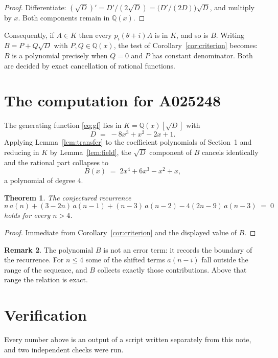 \documentclass[11pt,a4paper]{article}
\theoremstyle{plain}
\newtheorem{theorem}{Theorem}
\theoremstyle{definition}
\newtheorem{remark}[theorem]{Remark}
\begin{document}
\begin{proof}
Differentiate: $(\sqrt{D})'=D'/(2\sqrt{D})=\bigl(D'/(2D)\bigr)\sqrt{D}$, and multiply by
$x$. Both components remain in $\mathbb{Q}(x)$.
\end{proof}

Consequently, if $A\in K$ then every $p_{i}(\theta+i)A$ is in $K$, and so is $B$. Writing
$B=P+Q\sqrt{D}$ with $P,Q\in\mathbb{Q}(x)$, the test of Corollary~\ref{cor:criterion}
becomes: $B$ is a polynomial precisely when $Q=0$ and $P$ has constant denominator. Both
are decided by exact cancellation of rational functions.

\section{The computation for A025248}

The generating function \eqref{eq:gf} lies in $K=\mathbb{Q}(x)[\sqrt{D}]$ with
\[
D \;=\; - 8 x^{3} + x^{2} - 2 x + 1 .
\]
Applying Lemma~\ref{lem:transfer} to the coefficient polynomials of Section~1 and reducing
in $K$ by Lemma~\ref{lem:field}, the $\sqrt{D}$ component of $B$ cancels identically and
the rational part collapses to
\[
B(x)\;=\;2 x^{4} + 6 x^{3} - x^{2} + x ,
\]
a polynomial of degree $4$.

\begin{theorem}
The conjectured recurrence
\[
n\,a(n) + (3 - 2 n)\,a(n-1) + (n - 3)\,a(n-2) -  4 \left(2 n - 9\right)\,a(n-3) \;=\;0
\]
holds for every $n>4$.
\end{theorem}

\begin{proof}
Immediate from Corollary~\ref{cor:criterion} and the displayed value of $B$.
\end{proof}

\begin{remark}
The polynomial $B$ is not an error term: it records the boundary of the recurrence. For
$n\le4$ some of the shifted terms $a(n-i)$ fall outside the range of the sequence,
and $B$ collects exactly those contributions. Above that range the relation is exact.
\end{remark}

\section{Verification}

Every number above is an output of a script written separately from this note, and two
independent checks were run.
\end{document}
